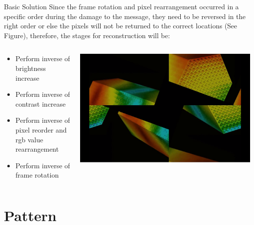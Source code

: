 \documentclass[xcolor=dvipsnames]{beamer}
\begin{document}
			\begin{frame}{Basic Solution}
				Since the frame rotation and pixel rearrangement occurred in a specific order during the damage to the message, they need to be reversed in the right order or else the pixels will not be returned to the correct locations (See Figure), therefore, the stages for reconstruction will be:
				
				\begin{columns}
					\begin{column}{0.6\textwidth}
						\begin{itemize}
							\item Perform inverse of brightness increase
							\item Perform inverse of contrast increase
							\item Perform inverse of pixel reorder and rgb value rearrangement
							\item Perform inverse of frame rotation
						\end{itemize}
					\end{column}
					\begin{column}{0.40\textwidth}
						\vspace{-.25in}\includegraphics[width=\textwidth]{images/badPixels} 
					\end{column} 
				\end{columns}
				
			\end{frame}

	
	\section{Pattern}
\end{document}
